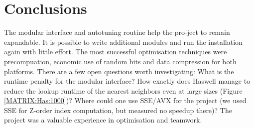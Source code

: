 \documentclass[letterpaper]{article}
\begin{document}
\section{Conclusions}
The modular interface and autotuning routine help the pro-ject to remain expandable. It is possible to write additional modules and run the installation again with little effort. The most successful optimisation techniques were precompuation, economic use of random bits and data compression for both platforms. There are a few open questions worth investigating: What is the runtime penalty for the modular interface? How exactly does Haswell manage to reduce the lookup runtime of the nearest neighbors even at large sizes (Figure \ref{MATRIX:Has:1000})? Where could one use SSE/AVX for the project (we used SSE for Z-order index computation, but measured no speedup there)? The project was a valuable experience in optimisation and teamwork. 



\end{document}

